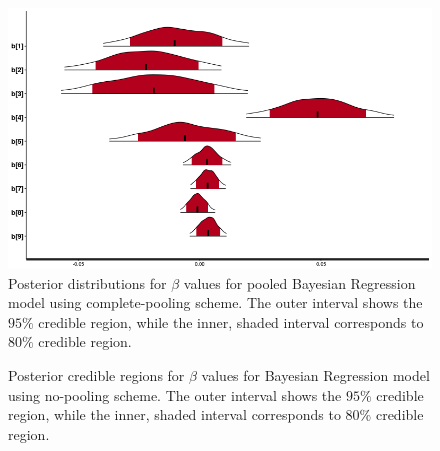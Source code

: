 \documentclass[12pt]{article}
\begin{document}
\begin{figure}[p]
  \centering
  \includegraphics[scale = 0.5]{figs/bayesian-credible-regions.png}
  \caption{Posterior distributions for $\beta$ values for pooled Bayesian Regression model using complete-pooling scheme. The outer interval shows the $95\%$ credible region, while the inner, shaded interval corresponds to $80\%$ credible region.}
  \label{fig:bayesian-credible}
\end{figure}

\begin{figure}[p]
\centering
\caption{Posterior credible regions for $\beta$ values for Bayesian Regression model using no-pooling scheme. The outer interval shows the $95\%$ credible region, while the inner, shaded interval corresponds to $80\%$ credible region.}
\label{fig:bayesian-unpooled-credible}
\end{figure}
\end{document}
